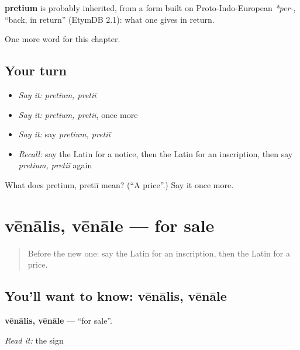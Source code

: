 \begin{cousinweb}
\textbf{pretium} is probably inherited, from a form built on Proto-Indo-European \emph{*per-}, \textquotedblleft{}back, in return\textquotedblright{} (EtymDB 2.1): what one gives in return.
\end{cousinweb}

\begin{grammarlens}[title={What you've built}]
One more word for this chapter.
\end{grammarlens}

\subsection*{Your turn}
\begin{itemize}
\raggedright
  \item \emph{Say it:} \emph{pretium, pretiī}
  \item \emph{Say it:} \emph{pretium, pretiī}, once more
  \item \emph{Say it:} say \emph{pretium, pretiī}
  \item \emph{Recall:} say the Latin for a notice, then the Latin for an inscription, then say \emph{pretium, pretiī} again
\end{itemize}

\begin{tcolorbox}[breakable,colback=teal!4,colframe=teal!35!black,title={Before you move on}]
What does pretium, pretiī mean? (\textquotedblleft{}A price\textquotedblright{}.) Say it once more.
\end{tcolorbox}
\section[vēnālis, vēnāle]{vēnālis, vēnāle — for sale}

\label{lesson:LA-C164-venalis}



\begin{quote}
Before the new one: say the Latin for an inscription, then the Latin for a price.
\end{quote}

\subsection*{You'll want to know: vēnālis, vēnāle}
\textbf{vēnālis, vēnāle} — \textquotedblleft{}for sale\textquotedblright{}.

\emph{Read it:} the sign

